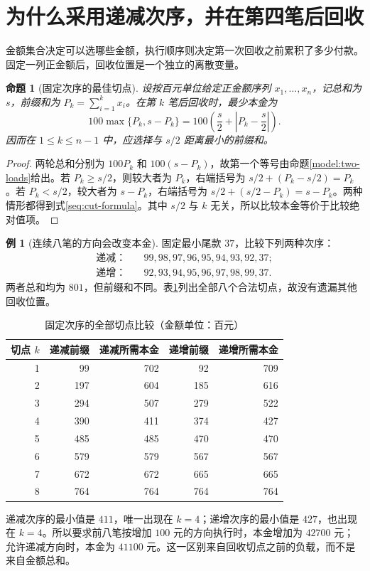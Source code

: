 \documentclass[UTF8,a4paper]{ctexbook}
\newtheorem{proposition}[theorem]{命题}
\theoremstyle{definition}
\newtheorem{example}[theorem]{例}
\numberwithin{equation}{chapter}
\newcommand{\1}{\mathbf{1}}
\begin{document}
\section{为什么采用递减次序，并在第四笔后回收}
金额集合决定可以选哪些金额，执行顺序则决定第一次回收之前累积了多少付款。固定一列正金额后，回收位置是一个独立的离散变量。

\begin{proposition}[固定次序的最佳切点]\label{seq:cut}
设按百元单位给定正金额序列 $x_1,\ldots,x_n$，记总和为 $s$，前缀和为 $P_k=\sum_{i=1}^{k}x_i$。在第 $k$ 笔后回收时，最少本金为
\begin{equation}\label{seq:cut-formula}
100\max\{P_k,s-P_k\}
=100\left(\frac{s}{2}+\left|P_k-\frac{s}{2}\right|\right).
\end{equation}
因而在 $1\le k\le n-1$ 中，应选择与 $s/2$ 距离最小的前缀和。
\end{proposition}
\begin{proof}
两轮总和分别为 $100P_k$ 和 $100(s-P_k)$，故第一个等号由命题\ref{model:two-loads}给出。若 $P_k\ge s/2$，则较大者为 $P_k$，右端括号为 $s/2+(P_k-s/2)=P_k$。若 $P_k<s/2$，较大者为 $s-P_k$，右端括号为 $s/2+(s/2-P_k)=s-P_k$。两种情形都得到式\eqref{seq:cut-formula}。其中 $s/2$ 与 $k$ 无关，所以比较本金等价于比较绝对值项。
\end{proof}

\begin{example}[连续八笔的方向会改变本金]
固定最小尾款 $37$，比较下列两种次序：
\[
\begin{split}
\text{递减：}&\quad99,98,97,96,95,94,93,92,37;\\
\text{递增：}&\quad92,93,94,95,96,97,98,99,37.
\end{split}
\]
两者总和均为 $801$，但前缀和不同。表\ref{seq:cut-table}列出全部八个合法切点，故没有遗漏其他回收位置。
\begin{table}[htbp]
\centering
\caption{固定次序的全部切点比较（金额单位：百元）}\label{seq:cut-table}
\begin{tabular}{@{}rrrrr@{}}
\toprule
切点 $k$ & 递减前缀 & 递减所需本金 & 递增前缀 & 递增所需本金\\
\midrule
1 & 99 & 702 & 92 & 709\\
2 & 197 & 604 & 185 & 616\\
3 & 294 & 507 & 279 & 522\\
4 & 390 & 411 & 374 & 427\\
5 & 485 & 485 & 470 & 470\\
6 & 579 & 579 & 567 & 567\\
7 & 672 & 672 & 665 & 665\\
8 & 764 & 764 & 764 & 764\\
\bottomrule
\end{tabular}
\end{table}
递减次序的最小值是 $411$，唯一出现在 $k=4$；递增次序的最小值是 $427$，也出现在 $k=4$。所以要求前八笔按增加 $100$ 元的方向执行时，本金增加为 $42700$ 元；允许递减方向时，本金为 $41100$ 元。这一区别来自回收切点之前的负载，而不是来自金额总和。
\end{example}
\end{document}
